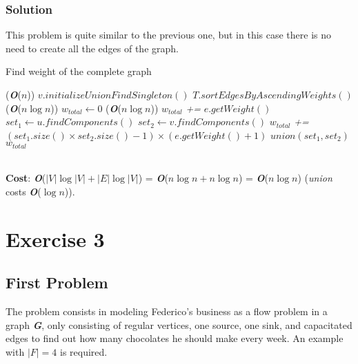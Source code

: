 \documentclass[11pt]{article}
\begin{document}
\subsubsection*{Solution}
This problem is quite similar to the previous one, but in this case there is no need to create all the edges of the graph.
\begin{algorithm}
	\caption{Find weight of the complete graph}\label{euclid}
	\begin{algorithmic}[1]
		 \qquad \qquad \qquad \qquad \qquad \qquad \qquad \qquad \qquad \qquad \qquad \qquad (\textbf{\textit{O}}($n$))
			\State $v.initializeUnionFindSingleton()$
		\EndFor
		\State $T.sortEdgesByAscendingWeights()$ \qquad \qquad \qquad \qquad \qquad \qquad \qquad (\textbf{\textit{O}}($n\log{n}$))
		\State $w_{total} \gets 0$
		 \qquad \qquad \qquad \qquad \qquad \qquad \qquad \qquad \qquad \qquad (\textbf{\textit{O}}($n \log{n}$))
			\State $w_{total}$ \textit{+=} $e.getWeight()$
			\State  $set_1 \gets u.findComponents()$
			\State  $set_2 \gets v.findComponents()$
			\State $w_{total}$ \textit{+=} $(set_1.size() \times set_2.size() - 1) \times (e.getWeight() + 1)$
			\State $union(set_1, set_2)$
		\EndFor
		\State \Return $w_{total}$
	\end{algorithmic}
\end{algorithm} \\
\textbf{Cost}: \textbf{\textit{O}}($|V|\log{|V|} + |E| \log{|V|}$) = \textbf{\textit{O}}($n\log{n} + n\log{n}$) = \textbf{\textit{O}}($n\log{n}$) (\textit{union} costs \textbf{\textit{O}}($\log{n}$)).
\newpage

\section*{Exercise 3}
\subsection*{First Problem}
The problem consists in modeling Federico's business as a flow problem in a graph \textbf{\textit{G}}, only consisting of regular vertices, one source, one sink, and capacitated edges to find out how many chocolates he should make every week. An example with $|F| = 4$ is required.
\end{document}
